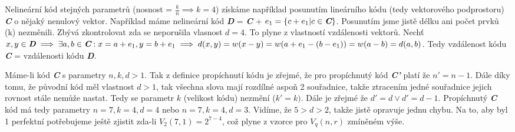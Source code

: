 \documentclass[12pt, a4paper]{article}
\begin{document}
Nelineární kód stejných parametrů (nosnost = $\frac{k}{n} \implies k=4$) získáme například posunutím lineárního kódu (tedy vektorového podprostoru) \textit{\textbf{C}} o nějaký nenulový vektor. Například máme nelineární kód \textit{\textbf{D}} = \textit{\textbf{C}} + $e_1 = \{c + e_1 | c \in \textit{\textbf{C}}\}$. Posunutím jsme jistě délku ani počet prvků (k) nezměnili. Zbývá zkontrolovat zda se neporušila vlasnost $d=4$. To plyne z vlastností vzdálenosti vektorů. Nechť $x,y \in \textit{\textbf{D}} \implies \exists a,b \in \textit{\textbf{C}} : x=a+e_1, y=b+e_1 \implies d(x,y) = w(x-y) = w(a+e_1-(b-e_1))=w(a-b)=d(a,b)$. Tedy vzdálenost kódu \textit{\textbf{C}} = vzdálenosti kódu \textit{\textbf{D}}.

Máme-li kód \textit{\textbf{C}} s parametry $n,k,d>1$. Tak z definice propíchnutí kódu je zřejmé, že pro propíchnutý kód \textit{\textbf{C'}} platí že $n'=n-1$. Dále díky tomu, že původní kód měl vlastnost $d>1$, tak všechna slova mají rozdílné aspoň 2 souřadnice, takže ztracením jedné souřadnice jejich rovnost stále nemůže nastat. Tedy se parametr $k$ (velikost kódu) nezmění ($k'=k)$. Dále je zřejmé že $d'= d \vee d'=d-1$. Propíchnutý \textit{\textbf{C}} kód má tedy parametry $n=7,k=4,d=4$ nebo $n=7,k=4,d=3$. Vidíme, že $5>d>2$, takže jistě opravuje jednu chybu. Na to, aby byl 1 perfektní potřebujeme ještě zjistit zda-li $V_{2}(7,1)=2^{7-4}$, což plyne z vzorce pro $V_{q}(n,r)$ zmíněném výše.
\end{document}
